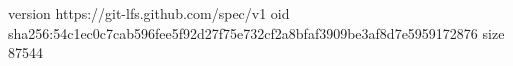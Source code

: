 version https://git-lfs.github.com/spec/v1
oid sha256:54c1ec0c7cab596fee5f92d27f75e732cf2a8bfaf3909be3af8d7e5959172876
size 87544
